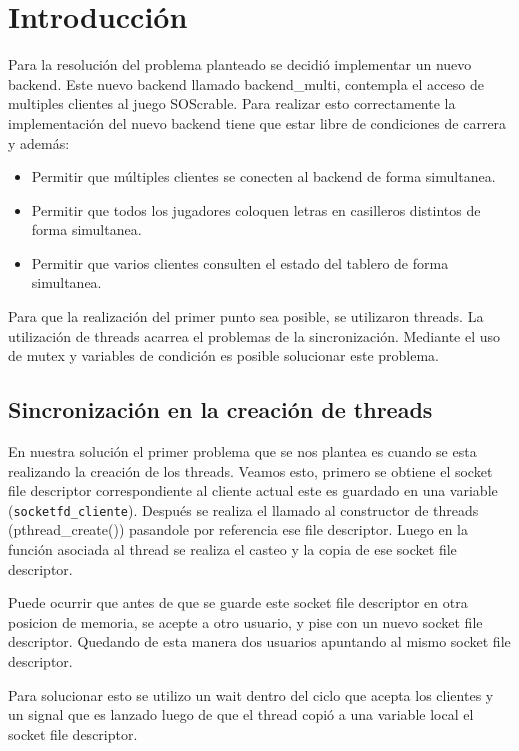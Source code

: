 \section{Introducci\'on}

Para la resoluci\'on del problema planteado se decidi\'o implementar un nuevo backend. Este nuevo backend llamado backend\_multi, contempla el acceso de multiples clientes al juego SOScrable. Para realizar esto correctamente la implementaci\'on del nuevo backend tiene que estar libre de condiciones de carrera y adem\'as:
\begin{itemize}
 \item Permitir que m\'ultiples clientes se conecten al backend de forma simultanea.
 \item Permitir que todos los jugadores coloquen letras en casilleros distintos de forma simultanea.
 \item Permitir que varios clientes consulten el estado del tablero de forma simultanea.
\end{itemize}

Para que la realizaci\'on del primer punto sea posible, se utilizaron threads. La utilizaci\'on de threads acarrea el problemas de la sincronizaci\'on. Mediante el uso de mutex y variables de condici\'on es posible solucionar este problema. 

\subsection{Sincronizaci\'on en la creaci\'on de threads}

En nuestra soluci\'on el primer problema que se nos plantea es cuando se esta realizando la creaci\'on de los threads. Veamos esto, primero se obtiene el socket file descriptor correspondiente al cliente actual este es guardado en una variable (\verb|socketfd_cliente|). Despu\'es se realiza el llamado al constructor de threads (pthread\_create()) pasandole por referencia ese file descriptor. Luego en la funci\'on asociada al thread se realiza el casteo y la copia de ese socket file descriptor.

Puede ocurrir que antes de que se guarde este socket file descriptor en otra posicion de memoria, se acepte a otro usuario, y pise con un nuevo socket file descriptor. Quedando de esta manera dos usuarios apuntando al mismo socket file descriptor. 

Para solucionar esto se utilizo un wait dentro del ciclo que acepta los clientes y un signal que es lanzado luego de que el thread copi\'o a una variable local el socket file descriptor. 


